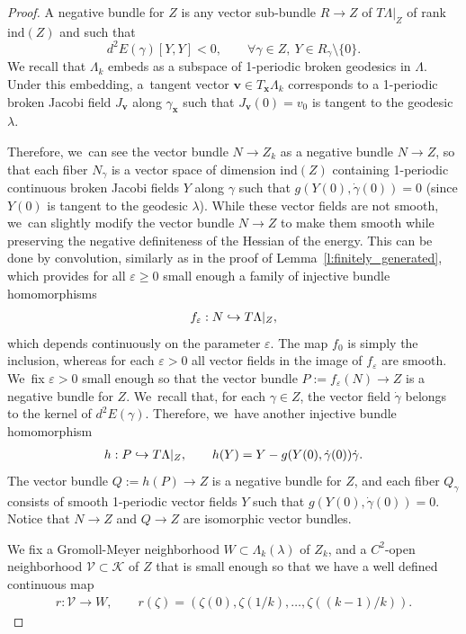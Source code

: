 \documentclass[JEP,XML,SOM,Unicode,NoFloatCountersInSection,published]{cedram}
\let\epsilon\varepsilon
\newcommand\hto{\mathrel{\lhook\joinrel\to}}
\let\bm\boldsymbol
\newcommand{\KK}{\mathcal{K}}
\newcommand{\VV}{\mathcal{V}}
\newcommand{\xx}{\bm{x}}
\newcommand{\vv}{\bm{v}}
\newcommand{\ind}{\mathrm{ind}}
\theoremstyle{plain}
\theoremstyle{definition}
\begin{document}
\begin{proof}
A negative bundle for $Z$ is any vector sub-bundle $R\to Z$ of $T\Lambda|_Z$ of rank $\ind(Z)$ and such that
\[
d^2E(\gamma)[Y,Y]<0,\qquad\forall \gamma\in Z,\ Y\in R_\gamma\setminus\{0\}.
\]
We recall that $\Lambda_k$ embeds as a subspace of 1-periodic broken geodesics in $\Lambda$. Under this embedding, a~tangent vector $\vv\in T_{\xx}\Lambda_k$ corresponds to a 1-periodic broken Jacobi field $J_{\vv}$ along $\gamma_{\xx}$ such that $J_{\vv}(0)=v_0$ is tangent to the geodesic $\lambda$.

Therefore, we~can see the vector bundle $N\to Z_k$ as a negative bundle $N\to Z$, so that each fiber $N_{\gamma}$ is a vector space of dimension $\ind(Z)$ containing 1-periodic continuous broken Jacobi fields $Y$ along $\gamma$ such that $g(Y(0),\dot\gamma(0))=0$ (since $Y(0)$ is tangent to the geodesic $\lambda$).
While these vector fields are not smooth, we~can slightly modify the vector bundle $N\to Z$ to make them smooth while preserving the negative definiteness of the Hessian of the energy. This can be done by convolution, similarly as in the proof of Lemma~\ref{l:finitely_generated}, which provides for all $\epsilon\geq0$ small enough a family of injective bundle homomorphisms
\begin{align*}
f_\epsilon:N\hto T\Lambda|_{Z},
\end{align*}
which depends continuously on the parameter $\epsilon$. The map $f_0$ is simply the inclusion, whereas for each $\epsilon>0$ all vector fields in the image of $f_\epsilon$ are smooth. We~fix $\epsilon>0$ small enough so that the vector bundle $P:=f_\epsilon(N)\to Z$ is a negative bundle for $Z$. We~recall that, for each $\gamma\in Z$, the vector field $\dot\gamma$ belongs to the kernel of $d^2E(\gamma)$. Therefore, we~have another injective bundle homomorphism
\begin{align*}
h:P\hto T\Lambda|_Z,\qquad h(Y)=Y-g(Y(0),\dot\gamma(0))\dot\gamma.
\end{align*}
The vector bundle $Q:=h(P)\to Z$ is a negative bundle for $Z$, and each fiber $Q_\gamma$ consists of smooth 1-periodic vector fields $Y$ such that $g(Y(0),\dot\gamma(0))=0$. Notice that $N\to Z$ and $Q\to Z$ are isomorphic vector bundles.

We fix a Gromoll-Meyer neighborhood $W\subset\Lambda_k(\lambda)$ of $Z_k$, and a $C^2$-open neighborhood $\VV\subset\KK$ of $Z$ that is small enough so that we have a well defined continuous map
\begin{align*}
r:\VV\to W,\qquad r(\zeta)=(\zeta(0),\zeta(1/k),\dots,\zeta((k-1)/k)).
\end{align*}


\end{proof}
\end{document}
